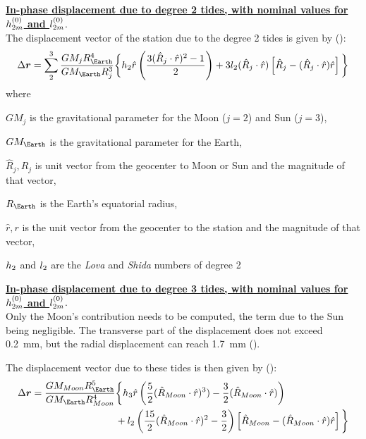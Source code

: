 \textbf{\ul{In-phase displacement due to degree 2 tides, with nominal values for 
$h ^{(0)}_{2m}$ and $l ^{(0)}_{2m}$}}.\\
The displacement vector of the station due to the degree 2 tides is given by 
(\cite{iers2010}):
\begin{equation}
  \Delta \bm{r} = \sum ^{3}_{2} \frac{GM_j R^4_{\Earth}}{GM_{\Earth}R^3_j}
    \biggl\{ \loveh _2 \hat{r} \left( \frac{3 (\hat{R}_j \cdot \hat{r})^2 -1}{2} \right) 
      + 3 \lovel _2 (\hat{R}_j \cdot \hat{r}) \left[ \hat{R}_j - (\hat{R}_j \cdot \hat{r}) \hat{r} \right] 
    \biggl\}
    \label{eq:iers105}
\end{equation}
where \begin{description}
  \item $GM_j$ is the gravitational parameter for the Moon ($j=2$) and Sun ($j=3$),
  \item $GM_{\Earth}$ is the gravitational parameter for the Earth,
  \item $\hat{R}_j, R_j$ is unit vector from the geocenter to Moon or Sun and 
    the magnitude of that vector,
  \item $R_{\Earth}$ is the Earth’s equatorial radius,
  \item $\hat{r}, r$ is the unit vector from the geocenter to the station and 
    the magnitude of that vector,
  \item $h _2$ and $l _2$ are the \emph{Lova} and \emph{Shida} numbers 
    of degree 2
\end{description}

\textbf{\ul{In-phase displacement due to degree 3 tides, with nominal values for
$h ^{(0)}_{2m}$ and $l ^{(0)}_{2m}$}}.\\

Only the Moon’s contribution needs to be computed, the term due to the Sun being
negligible. The transverse part of the displacement does not exceed \SI{0.2}{\mm}, 
but the radial displacement can reach \SI{1.7}{\mm} (\cite{iers2010}).

The displacement vector due to these tides is then given by (\cite{iers2010}):
\begin{equation}
  \begin{aligned}
  \Delta \bm{r} = \frac{GM_{Moon} R^5_{\Earth}}{GM_{\Earth}R^4_{Moon}} &
    \biggl\{ \loveh _3 \hat{r} \left( \frac{5}{2} (\hat{R}_{Moon} \cdot \hat{r})^3) -\frac{3}{2} (\hat{R}_{Moon} \cdot \hat{r}) \right) \\
      & + \lovel _2 \left( \frac{15}{2}(\hat{R}_{Moon} \cdot \hat{r})^2 - \frac{3}{2}\right) \left[ \hat{R}_{Moon} - (\hat{R}_{Moon} \cdot \hat{r}) \hat{r} \right] 
    \biggl\}
    \end{aligned}
    \label{eq:iers106}
\end{equation}

